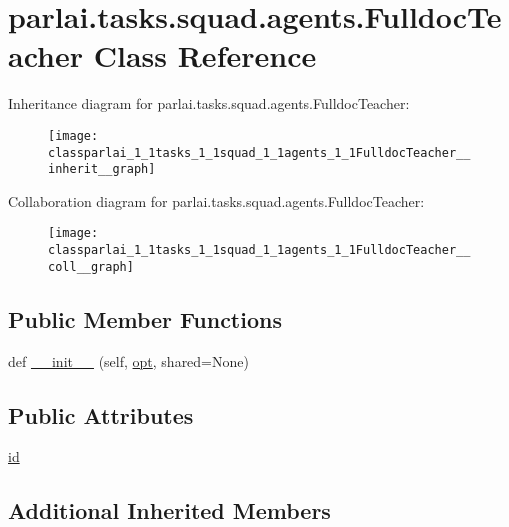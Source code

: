 \hypertarget{classparlai_1_1tasks_1_1squad_1_1agents_1_1FulldocTeacher}{}\section{parlai.\+tasks.\+squad.\+agents.\+Fulldoc\+Teacher Class Reference}
\label{classparlai_1_1tasks_1_1squad_1_1agents_1_1FulldocTeacher}


Inheritance diagram for parlai.\+tasks.\+squad.\+agents.\+Fulldoc\+Teacher\+:
\nopagebreak
\begin{figure}[H]
\begin{center}
\leavevmode
\texttt{[image: classparlai\_1\_1tasks\_1\_1squad\_1\_1agents\_1\_1FulldocTeacher\_\_inherit\_\_graph]}
\end{center}
\end{figure}


Collaboration diagram for parlai.\+tasks.\+squad.\+agents.\+Fulldoc\+Teacher\+:
\nopagebreak
\begin{figure}[H]
\begin{center}
\leavevmode
\texttt{[image: classparlai\_1\_1tasks\_1\_1squad\_1\_1agents\_1\_1FulldocTeacher\_\_coll\_\_graph]}
\end{center}
\end{figure}
\subsection*{Public Member Functions}
\begin{DoxyCompactItemize}
\item 
def \hyperlink{classparlai_1_1tasks_1_1squad_1_1agents_1_1FulldocTeacher_aa686d3cf1506d8f17e373c0b5db6e1bd}{\+\_\+\+\_\+init\+\_\+\+\_\+} (self, \hyperlink{classparlai_1_1core_1_1agents_1_1Teacher_a3ce6243860ce978a897922863ed32fa4}{opt}, shared=None)
\end{DoxyCompactItemize}
\subsection*{Public Attributes}
\begin{DoxyCompactItemize}
\item 
\hyperlink{classparlai_1_1tasks_1_1squad_1_1agents_1_1FulldocTeacher_a3fca2b49bb7fffc80462c30b700a6168}{id}
\end{DoxyCompactItemize}
\subsection*{Additional Inherited Members}


